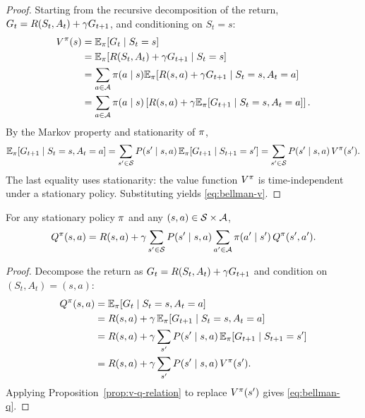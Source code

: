\documentclass[11pt,a4paper]{article}
\begin{document}
\begin{proof}
Starting from the recursive decomposition of the return,
$G_t = R(S_t, A_t) + \gamma G_{t+1}$, and conditioning on
$S_t = s$:
\begin{align*}
    V^{\pi}(s)
    &= \mathbb{E}_\pi[G_t \mid S_t = s] \\
    &= \mathbb{E}_\pi[R(S_t, A_t) + \gamma G_{t+1} \mid S_t = s] \\
    &= \sum_{a \in \mathcal{A}} \pi(a \mid s)
       \mathbb{E}_\pi[R(s, a) + \gamma G_{t+1}
       \mid S_t = s, A_t = a] \\
    &= \sum_{a \in \mathcal{A}} \pi(a \mid s)
       \left[ R(s,a) + \gamma
       \mathbb{E}_\pi[G_{t+1} \mid S_t = s, A_t = a] \right].
\end{align*}
By the Markov property and stationarity of $\pi$,
\[
    \mathbb{E}_\pi[G_{t+1} \mid S_t = s, A_t = a]
    = \sum_{s' \in \mathcal{S}} P(s' \mid s,a)\,
      \mathbb{E}_\pi[G_{t+1} \mid S_{t+1} = s']
    = \sum_{s' \in \mathcal{S}} P(s' \mid s,a)\, V^{\pi}(s').
\]
The last equality uses stationarity: the value function $V^{\pi}$ is
time-independent under a stationary policy. Substituting yields
\eqref{eq:bellman-v}.
\end{proof}

\begin{theorem}
\label{thm:bellman-q}
For any stationary policy $\pi$ and any
$(s,a) \in \mathcal{S} \times \mathcal{A}$,
\begin{equation}
\label{eq:bellman-q}
    Q^{\pi}(s,a) = R(s,a) + \gamma \sum_{s' \in \mathcal{S}}
    P(s' \mid s,a) \sum_{a' \in \mathcal{A}}
    \pi(a' \mid s')\, Q^{\pi}(s', a').
\end{equation}
\end{theorem}

\begin{proof}
Decompose the return as $G_t = R(S_t, A_t) + \gamma G_{t+1}$ and
condition on $(S_t, A_t) = (s, a)$:
\begin{align*}
    Q^{\pi}(s,a)
    &= \mathbb{E}_\pi[G_t \mid S_t = s, A_t = a] \\
    &= R(s,a) + \gamma\, \mathbb{E}_\pi[G_{t+1} \mid S_t = s, A_t = a] \\
    &= R(s,a) + \gamma \sum_{s'} P(s' \mid s,a)\,
       \mathbb{E}_\pi[G_{t+1} \mid S_{t+1} = s'] \\
    &= R(s,a) + \gamma \sum_{s'} P(s' \mid s,a)\, V^{\pi}(s').
\end{align*}
Applying Proposition~\ref{prop:v-q-relation} to replace $V^{\pi}(s')$
gives \eqref{eq:bellman-q}.
\end{proof}
\end{document}
